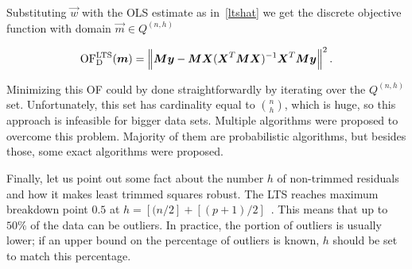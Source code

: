 Substituting $\vec{w}$ with the OLS estimate as in~\eqref{ltshat} we get
the discrete objective function with domain $\vec{m} \in Q^{(n,h)}$

\begin{equation} \label{oflts_discrete}
    \operatorname{OF^{LTS}_D}(\boldsymbol{m}) =  \left\lVert \boldsymbol{M}\boldsymbol{y} -  \boldsymbol{M}\boldsymbol{X}(\boldsymbol{X}^T\boldsymbol{M}\boldsymbol{X})^{-1}\boldsymbol{X}^T\boldsymbol{M}\boldsymbol{y}  \right\rVert^2.
\end{equation}

Minimizing this OF could by done straightforwardly by iterating over the $Q^{(n,h)}$ set. Unfortunately, this set has cardinality equal to $\binom{n}{h}$, which is huge, so this approach is infeasible for bigger data sets. Multiple algorithms were proposed to overcome this problem. Majority of them are probabilistic algorithms, but besides those, some exact algorithms were proposed. 

Finally, let us point out some fact about the number $h$ of non-trimmed residuals and how it makes least trimmed squares robust.
The LTS reaches maximum breakdown point $0.5$ at $h = [(n/2] + [(p+1)/2]$~\cite{agullo2001new}.
This means that up to $50\%$ of the data can be outliers. In practice, the portion of outliers is usually lower; if an upper bound on the percentage of outliers is known,  $h$ should be set to match this percentage.